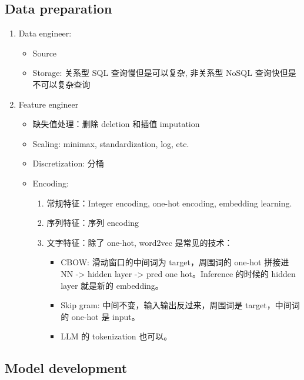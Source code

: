 \documentclass[12pt]{article}
\numberwithin{theorem}{section} %
\numberwithin{definition}{section} %
\numberwithin{assumption}{section} %
\numberwithin{lemma}{section} %
\numberwithin{remark}{section} %
\numberwithin{prop}{section} %
\numberwithin{corollary}{section} %
\numberwithin{example}{section} %
\numberwithin{question}{section} %
\numberwithin{problem}{section} %
\numberwithin{conjecture}{section} %
\numberwithin{append}{section} %
\numberwithin{property}{section} %
\begin{document}
\begin{CJK}{UTF8}{gbsn}
	\subsection{Data preparation}
	\begin{enumerate}
		\item Data engineer: 
		\begin{itemize}
			\item Source
			\item Storage: 关系型 SQL 查询慢但是可以复杂, 非关系型 NoSQL 查询快但是不可以复杂查询
		\end{itemize}
		\item Feature engineer
		\begin{itemize}
			\item 缺失值处理：删除 deletion 和插值 imputation
			\item Scaling: minimax, standardization, log, etc.
			\item Discretization: 分桶
			\item Encoding: 
			\begin{enumerate}
				\item 常规特征：Integer encoding, one-hot encoding, embedding learning.
				\item 序列特征：序列 encoding
				\item 文字特征：除了 one-hot, word2vec 是常见的技术： 
				\begin{itemize}
					\item CBOW: 滑动窗口的中间词为 target，周围词的 one-hot 拼接进 NN -> hidden layer -> pred one hot。Inference 的时候的 hidden layer 就是新的 embedding。
					\item Skip gram: 中间不变，输入输出反过来，周围词是 target，中间词的 one-hot 是 input。
					\item LLM 的 tokenization 也可以。
				\end{itemize}
				
			\end{enumerate}
			
		\end{itemize}
	\end{enumerate}
	\subsection{Model development}


\end{CJK}
\end{document}
